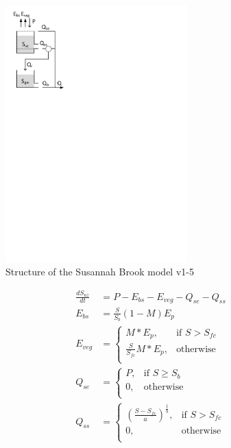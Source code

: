 { 																	%
\begin{figure}
\includegraphics[trim=1cm 20cm 10cm 1cm,width=7cm,keepaspectratio]{./AppA_files/09_schematic.pdf}
\caption{Structure of the Susannah Brook model v1-5} \label{fig:09_schematic}
\end{figure}

\begin{align}
	\frac{dS_{uz}}{dt} &= P-E_{bs}-E_{veg}-Q_{se}-Q_{ss}\\
	E_{bs} &= \frac{S}{S_b}\left(1-M\right)E_p\\
	E_{veg} &= \begin{cases}
		M*E_p, &\text{if } S >S_{fc}\\
		\frac{S}{S_{fc}}M*E_p, &\text{otherwise}\\
	\end{cases}\\
	Q_{se} &= \begin{cases}
		P, &\text{if } S \geq S_b\\
		0, &\text{otherwise}\\
	\end{cases}\\
	Q_{ss} &= \begin{cases}
		\left(\frac{S-S_{fc}}{a}\right)^{\frac{1}{b}}, &\text{if } S > S_{fc}\\
		0, &\text{otherwise}\\
	\end{cases}
\end{align}

\vspace{2cm}
}


